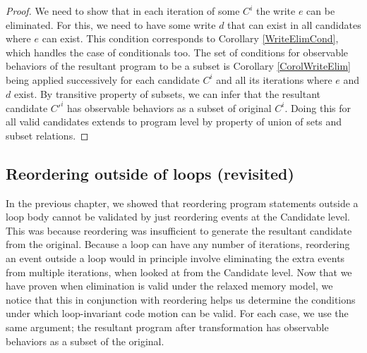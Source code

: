         \begin{proof}
            
            We need to show that in each iteration of some $C^i$ the write $e$ can be eliminated. 
            For this, we need to have some write $d$ that can exist in all candidates where $e$ can exist. 
            This condition corresponds to Corollary \ref{WriteElimCond}, which handles the case of conditionals too. 
            The set of conditions for observable behaviors of the resultant program to be a subset is Corollary \ref{CorolWriteElim} being applied successively for each candidate $C^i$ and all its iterations where $e$ and $d$ exist. 
            By transitive property of subsets, we can infer that the resultant candidate $C'^i$ has observable behaviors as a subset of original $C^i$. 
            Doing this for all valid candidates extends to program level by property of union of sets and subset relations\footnotemark.
    
                
        \end{proof}
         
        \subsection{Reordering outside of loops (revisited)}  

            In the previous chapter, we showed that reordering program statements outside a loop body cannot be validated by just reordering events at the Candidate level. 
            This was because reordering was insufficient to generate the resultant candidate from the original. 
            Because a loop can have any number of iterations, reordering an event outside a loop would in principle involve eliminating the extra events from multiple iterations, when looked at from the Candidate level. 
            Now that we have proven when elimination is valid under the relaxed memory model, we notice that this in conjunction with reordering helps us determine the conditions under which loop-invariant code motion can be valid.
            For each case, we use the same argument; the resultant program after transformation has observable behaviors as a subset of the original. 

